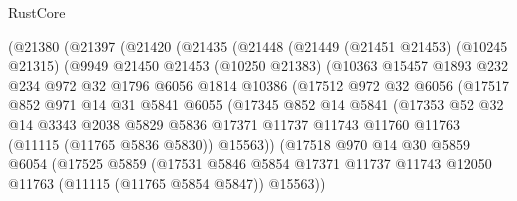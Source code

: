 \begin{lexlean}{RustCore}
\begin{coremodule}
          (@21380
            (@21397
              (@21420
                (@21435
                  (@21448
                    (@21449
                      (@21451 @21453)
                      (@10245 @21315)
                      (@9949
                        @21450
                        @21453
                        (@10250 @21383)
                        (@10363
                          @15457
                          @1893
                          @232
                          @234
                          @972
                          @32
                          @1796
                          @6056
                          @1814
                          @10386
                          (@17512
                            @972
                            @32
                            @6056
                            (@17517
                              @852
                              @971
                              @14
                              @31
                              @5841
                              @6055
                              (@17345
                                @852
                                @14
                                @5841
                                (@17353
                                  @52
                                  @32
                                  @14
                                  @3343
                                  @2038
                                  @5829
                                  @5836
                                  @17371
                                  @11737
                                  @11743
                                  @11760
                                  @11763
                                  (@11115 (@11765 @5836 @5830))
                                  @15563))
                              (@17518
                                @970
                                @14
                                @30
                                @5859
                                @6054
                                (@17525
                                  @5859
                                  (@17531
                                    @5846
                                    @5854
                                    @17371
                                    @11737
                                    @11743
                                    @12050
                                    @11763
                                    (@11115 (@11765 @5854 @5847))
                                    @15563))

\end{coremodule}
\end{lexlean}
